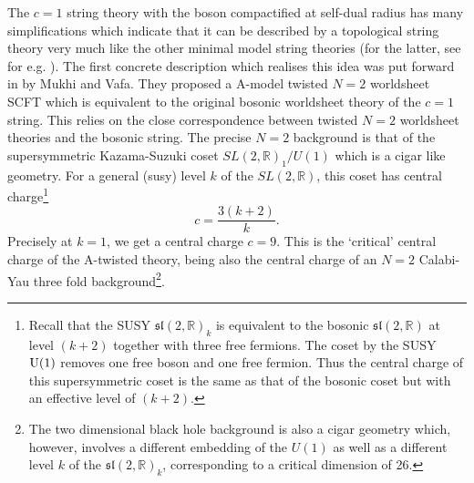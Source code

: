 \documentclass[english]{article}
\begin{document}
The $c=1$ string theory with the boson compactified at self-dual radius has many simplifications which indicate that it can be described by a topological string theory very much like the other minimal model string theories (for the latter, see for e.g. \cite{dijkgraaf1991topological}). The first concrete description which realises this idea was put forward 
in \cite{MukhiVafa} by Mukhi and Vafa. They proposed a A-model twisted $N=2$ worldsheet SCFT which is equivalent to the original bosonic worldsheet theory of the $c=1$ string. This relies on the close correspondence between twisted $N=2$ worldsheet theories and the bosonic string. The precise $N=2$ background is that of the supersymmetric Kazama-Suzuki coset $SL(2,\mathbb{R})_1/U(1)$ which is a cigar like geometry. For a general (susy) level $k$ of the $SL(2,\mathbb{R})$, this coset has central charge\footnote{Recall that the SUSY $\mathfrak{sl}(2, \mathbb{R})_k$ is equivalent to the bosonic $\mathfrak{sl}(2, \mathbb{R})$ at level $(k+2)$ together with three free fermions. The coset by the SUSY ${\rm U}(1)$ removes one free boson and one free fermion. Thus the central charge of this supersymmetric coset is the same as that of the bosonic coset but with an effective level of $(k+2)$.} 
\begin{equation}
c=\frac{3(k+2)}{k} .  
\end{equation}
Precisely at $k=1$, we get a central charge $c=9$. This is the `critical' central charge of the A-twisted theory, being also the central charge of an $N=2$  Calabi-Yau three fold background\footnote{The two dimensional black hole background \cite{witten2dBlackHole, MSW, Elitzur:1990ubs, DVV2dblackholeprop } is also a cigar geometry which, however, involves a different embedding of the $U(1)$ as well as a different level $k$ of the $\mathfrak{sl}(2, \mathbb{R})_k$, corresponding to a critical dimension of 26.}.   
\end{document}
